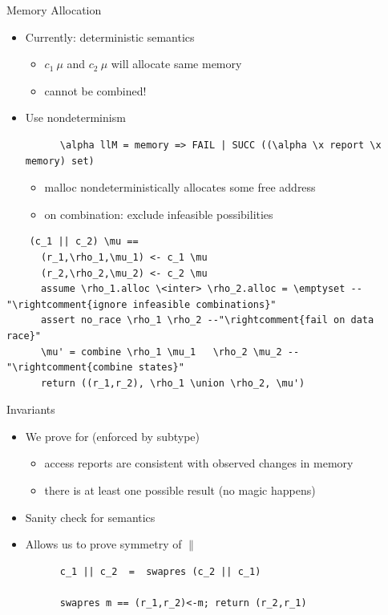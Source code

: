 \documentclass[fleqn]{beamer}
\begin{document}
\begin{frame}[fragile]{Memory Allocation}
  \begin{itemize}
   \item<+-> Currently: deterministic semantics
    \begin{itemize}
     \item $c_1~\mu$ and $c_2~\mu$ will allocate same memory
     \item cannot be combined!

    \end{itemize}
   \item<+-> Use nondeterminism
    \begin{lstlisting}
      \alpha llM = memory => FAIL | SUCC ((\alpha \x report \x memory) set)
    \end{lstlisting}
    \begin{itemize}
     \item malloc nondeterministically allocates some free address
     \item on combination: exclude infeasible possibilities

    \end{itemize}
  \end{itemize}
  \onslide<+->
  \begin{lstlisting}
    (c_1 || c_2) \mu ==
      (r_1,\rho_1,\mu_1) <- c_1 \mu
      (r_2,\rho_2,\mu_2) <- c_2 \mu
      assume \rho_1.alloc \<inter> \rho_2.alloc = \emptyset --"\rightcomment{ignore infeasible combinations}"
      assert no_race \rho_1 \rho_2 --"\rightcomment{fail on data race}"
      \mu' = combine \rho_1 \mu_1   \rho_2 \mu_2 --"\rightcomment{combine states}"
      return ((r_1,r_2), \rho_1 \union \rho_2, \mu')

  \end{lstlisting}

\end{frame}
\begin{frame}[fragile]{Invariants}
  \begin{itemize}
   \item We prove for  (enforced by subtype)
    \begin{itemize}
     \item access reports are consistent with observed changes in memory
     \item there is at least one possible result (no magic happens)

    \end{itemize}
   \item Sanity check for semantics

   \item Allows us to prove symmetry of $\parallel$
    \begin{lstlisting}
      c_1 || c_2  =  swapres (c_2 || c_1)

      swapres m == (r_1,r_2)<-m; return (r_2,r_1)
    \end{lstlisting}

  \end{itemize}
\end{frame}
\end{document}
